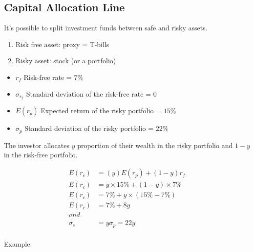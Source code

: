 \documentclass[
]{book}
\providecommand{\tightlist}{%
  \setlength{\itemsep}{0pt}\setlength{\parskip}{0pt}}
\begin{document}
\hypertarget{capital-allocation-line}{%
\subsection{Capital Allocation Line}\label{capital-allocation-line}}

It's possible to split investment funds between safe and risky assets.

\begin{enumerate}
\def\labelenumi{\arabic{enumi}.}
\tightlist
\item
  Risk free asset: proxy = T-bills
\item
  Risky asset: stock (or a portfolio)
\end{enumerate}

\begin{itemize}
\tightlist
\item
  \(r_f\) Risk-free rate = \(7\%\)
\item
  \(\sigma_{r_f}\) Standard deviation of the risk-free rate = \(0\)
\item
  \(E(r_p)\) Expected return of the risky portfolio = \(15\%\)
\item
  \(\sigma_p\) Standard deviation of the risky portfolio = \(22\%\)
\end{itemize}

The investor allocates \(y\) proportion of their wealth in the risky portfolio and \(1 - y\) in the risk-free portfolio.

\[
\begin{aligned}
E(r_c) &= (y)E(r_p) + (1 - y)r_f \\
E(r_c) &= y \times 15\% + (1 - y) \times 7\% \\
E(r_c) &= 7\% + y \times (15\% - 7\%) \\
E(r_c) &= 7\% + 8y \\
and \\
\sigma_c &= y \sigma_𝑝=22𝑦\\
\end{aligned}
\]

Example:
\end{document}
